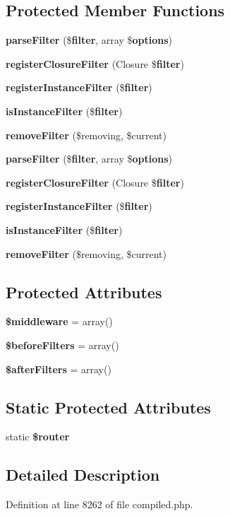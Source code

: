 \subsection*{Protected Member Functions}
\begin{DoxyCompactItemize}
\item 
{\bf parse\+Filter} (\${\bf filter}, array \${\bf options})
\item 
{\bf register\+Closure\+Filter} (Closure \${\bf filter})
\item 
{\bf register\+Instance\+Filter} (\${\bf filter})
\item 
{\bf is\+Instance\+Filter} (\${\bf filter})
\item 
{\bf remove\+Filter} (\$removing, \$current)
\item 
{\bf parse\+Filter} (\${\bf filter}, array \${\bf options})
\item 
{\bf register\+Closure\+Filter} (Closure \${\bf filter})
\item 
{\bf register\+Instance\+Filter} (\${\bf filter})
\item 
{\bf is\+Instance\+Filter} (\${\bf filter})
\item 
{\bf remove\+Filter} (\$removing, \$current)
\end{DoxyCompactItemize}
\subsection*{Protected Attributes}
\begin{DoxyCompactItemize}
\item 
{\bf \$middleware} = array()
\item 
{\bf \$before\+Filters} = array()
\item 
{\bf \$after\+Filters} = array()
\end{DoxyCompactItemize}
\subsection*{Static Protected Attributes}
\begin{DoxyCompactItemize}
\item 
static {\bf \$router}
\end{DoxyCompactItemize}


\subsection{Detailed Description}


Definition at line 8262 of file compiled.\+php.



